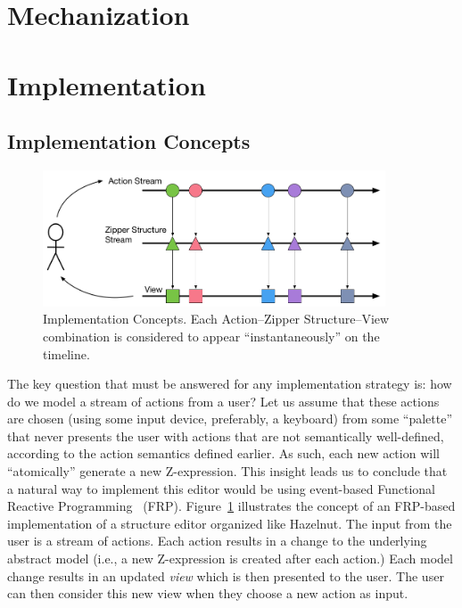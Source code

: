 \documentclass{llncs}
\begin{document}
\section{Mechanization}
\label{sec:mech}\label{sec:mt}


\section{Implementation}
\label{sec:impl}

\subsection{Implementation Concepts}

\begin{figure}
\centering
\includegraphics[width=4in]{Implementation_Diagram}
\caption{Implementation Concepts. Each Action--Zipper Structure--View combination is considered to appear ``instantaneously'' on the timeline.}
\label{fig:FRP}
\end{figure}

The key question that must be answered for any implementation strategy is: how do we model a stream of actions from a user? Let us assume that these actions are chosen (using some input device, preferably, a keyboard) from some ``palette'' that never presents the user with actions that are not semantically well-defined, according to the action semantics defined earlier.
As such, each new action will ``atomically'' generate a new Z-expression. 
This insight leads us to conclude that a natural way to implement this editor would be using event-based Functional Reactive Programming~\cite{Wan:2000:FRP:349299.349331} (FRP).
Figure~\ref{fig:FRP} illustrates the concept of an FRP-based implementation of a  structure editor organized like Hazelnut.
The input from the user is a stream of actions.  Each action results in a change to the underlying abstract model (i.e., a new Z-expression is created after each action.)
Each model change results in an updated \emph{view} which is then presented to the user.  The user can then consider this new view when they choose a new action as input.
\end{document}
